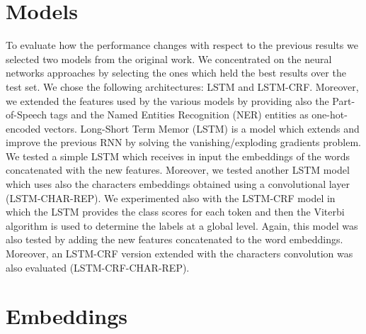 \documentclass[11pt,a4paper]{article}
\begin{document}
\section{Models}

To evaluate how the performance changes with respect 
to the previous results we selected two models from 
the original work. We concentrated on the neural 
networks approaches by selecting the ones which held 
the best results over the test set. We chose the 
following architectures: LSTM and LSTM-CRF.  
Moreover, we extended the features used by the 
various models by providing also the Part-of-Speech 
tags and the Named Entities Recognition (NER) 
entities as one-hot-encoded vectors.
Long-Short Term Memor (LSTM) \cite{lstm} is a model 
which extends and improve the previous RNN by 
solving the vanishing/exploding gradients problem. 
We tested a simple LSTM which receives in input the 
embeddings of the words concatenated with the new 
features. Moreover, we tested another LSTM model 
which uses also the characters embeddings obtained 
using a convolutional layer (LSTM-CHAR-REP). 
We experimented also with the LSTM-CRF model \cite{
yao2014recurrent, DBLP:journals/corr/HuangXY15} in 
which the LSTM provides the class scores for each 
token and then the Viterbi algorithm is used to 
determine the labels at a global level.  Again, this 
model was also tested by adding the new features 
concatenated to the word embeddings. Moreover, an 
LSTM-CRF version extended with the characters 
convolution was also evaluated (LSTM-CRF-CHAR-REP).

\section{Embeddings}
\end{document}
